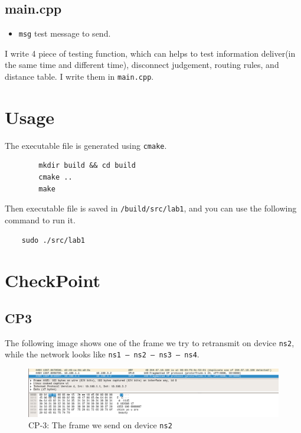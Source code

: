 \documentclass[11pt]{article}
\begin{document}
	\subsection*{main.cpp}
		
	\begin{itemize}
		\item \texttt{msg} test message to send.
	\end{itemize}
	
	\par I write 4 piece of testing function, which can helps to test information deliver(in the same time and different time), disconnect judgement, routing rules, and distance table. I write them in \texttt{main.cpp}.
	
	\section{Usage}
	
	The executable file is generated using \texttt{cmake}.
	
	\lstset{language = bash}
	\begin{lstlisting}
		mkdir build && cd build
		cmake ..
		make
	\end{lstlisting}
	
	Then executable file is saved in \texttt{/build/src/lab1}, and you can use the following command to run it.
	
	\begin{lstlisting}
	sudo ./src/lab1
	\end{lstlisting}

	
	\section{CheckPoint}
	
	\subsection*{CP3}
	
	The following image shows one of the frame we try to retransmit on device \texttt{ns2}, while the network looks like \texttt{ns1 -- ns2 -- ns3 -- ns4}.
	
	\begin{figure}[htbp]
	\centering
	\includegraphics[width=0.9\linewidth]{../lab-netstack-premium-master/checkpoints/CP3.png}
	\caption{CP-3: The frame we send on device \texttt{ns2}}
	\label{fig:CP1}
	\end{figure}
	
\end{document}
